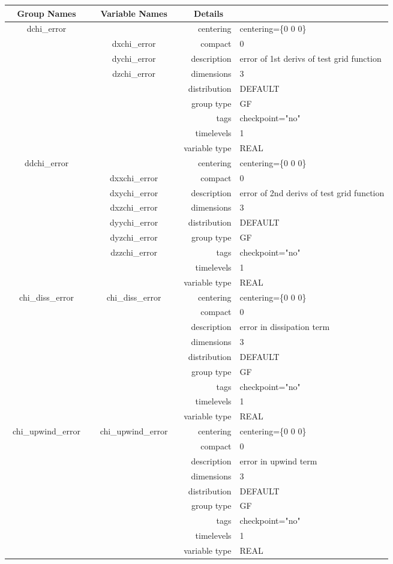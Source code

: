 \begin{tabular*}{150mm}{|c|c@{\extracolsep{\fill}}|rl|} \hline 
~ {\bf Group Names} ~ & ~ {\bf Variable Names} ~  &{\bf Details} ~ & ~ \\ 
\hline 
dchi\_error &  & centering & centering=\{0 0 0\} \\ 
 & dxchi\_error & compact & 0 \\ 
 & dychi\_error & description & error of 1st derivs of test grid function \\ 
 & dzchi\_error & dimensions & 3 \\ 
 &  & distribution & DEFAULT \\ 
 &  & group type & GF \\ 
 &  & tags & checkpoint="no" \\ 
 &  & timelevels & 1 \\ 
 &  & variable type & REAL \\ 
\hline 
ddchi\_error &  & centering & centering=\{0 0 0\} \\ 
 & dxxchi\_error & compact & 0 \\ 
 & dxychi\_error & description & error of 2nd derivs of test grid function \\ 
 & dxzchi\_error & dimensions & 3 \\ 
 & dyychi\_error & distribution & DEFAULT \\ 
 & dyzchi\_error & group type & GF \\ 
 & dzzchi\_error & tags & checkpoint="no" \\ 
 &  & timelevels & 1 \\ 
 &  & variable type & REAL \\ 
\hline 
chi\_diss\_error & chi\_diss\_error & centering & centering=\{0 0 0\} \\ 
 &  & compact & 0 \\ 
 &  & description & error in dissipation term \\ 
 &  & dimensions & 3 \\ 
 &  & distribution & DEFAULT \\ 
 &  & group type & GF \\ 
 &  & tags & checkpoint="no" \\ 
 &  & timelevels & 1 \\ 
 &  & variable type & REAL \\ 
\hline 
chi\_upwind\_error & chi\_upwind\_error & centering & centering=\{0 0 0\} \\ 
 &  & compact & 0 \\ 
 &  & description & error in upwind term \\ 
 &  & dimensions & 3 \\ 
 &  & distribution & DEFAULT \\ 
 &  & group type & GF \\ 
 &  & tags & checkpoint="no" \\ 
 &  & timelevels & 1 \\ 
 &  & variable type & REAL \\ 
\hline 
\end{tabular*} 



